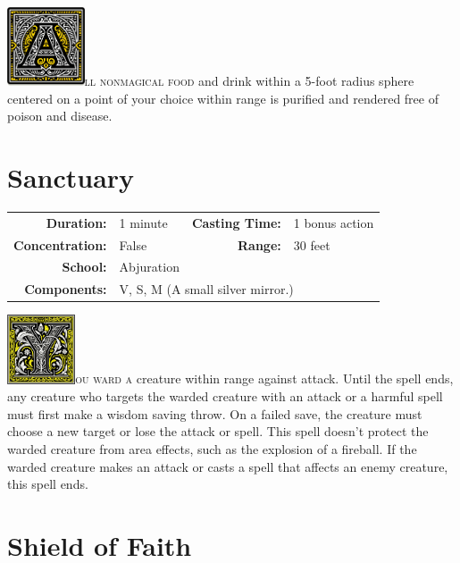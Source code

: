 \documentclass[12pt,showtrims]{memoir}
\begin{document}
\vspace{1\baselineskip}\noindent 
\lettrine[lines=4]{\includegraphics[height=66pt]{initials/A.png}}{ll nonmagical food} and drink within a 5-foot radius sphere centered on a point of your choice within range is purified and rendered free of poison and disease.

\newpage
\section*{Sanctuary}

{
\small\centering\vspace{-6pt}
\begin{tabular}{rlrl}
\toprule

\textbf{Duration:} & 1 minute &
\textbf{Casting Time:} & 1 bonus action \\
\textbf{Concentration:} & False &
\textbf{Range:} & 30 feet \\
\textbf{School:} & Abjuration \\
\textbf{Components:} & \multicolumn{3}{p{0.7\textwidth}}{V, S, M (A small silver mirror.)}\\

\bottomrule
\end{tabular}
}

\vspace{1\baselineskip}\noindent
\lettrine[lines=4]{\includegraphics[height=58pt]{initials/Y.png}}{ou ward a} creature within range against attack. Until the spell ends, any creature who targets the warded creature with an attack or a harmful spell must first make a wisdom saving throw. On a failed save, the creature must choose a new target or lose the attack or spell. This spell doesn't protect the warded creature from area effects, such as the explosion of a fireball. If the warded creature makes an attack or casts a spell that affects an enemy creature, this spell ends.

\newpage
\section*{Shield of Faith}
\end{document}
